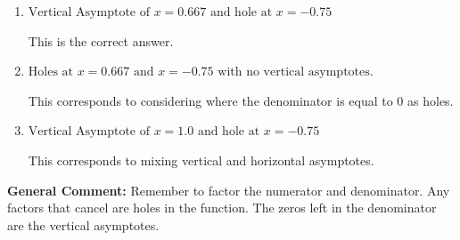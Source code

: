 \documentclass{extbook}[14pt]
\begin{document}
\begin{enumerate}
{\begin{enumerate}[label=\Alph*.]
This corresponds to not factoring out the hole.
\item \( \text{Vertical Asymptote of } x = 0.667 \text{ and hole at } x = -0.75 \)

This is the correct answer.
\item \( \text{Holes at } x = 0.667 \text{ and } x = -0.75 \text{ with no vertical asymptotes.} \)

This corresponds to considering where the denominator is equal to 0 as holes.
\item \( \text{Vertical Asymptote of } x = 1.0 \text{ and hole at } x = -0.75 \)

This corresponds to mixing vertical and horizontal asymptotes.
\end{enumerate}

\textbf{General Comment:} Remember to factor the numerator and denominator. Any factors that cancel are holes in the function. The zeros left in the denominator are the vertical asymptotes.
}
\end{enumerate}
\end{document}
